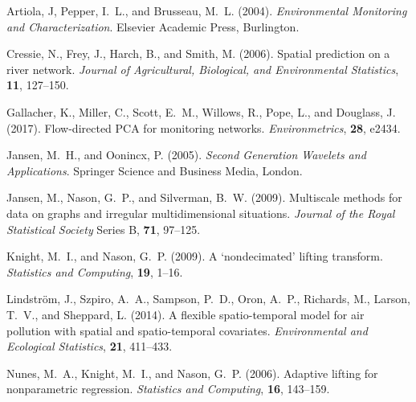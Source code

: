 \documentclass[11pt,titlepage]{article}
\begin{document}
\begin{thebibliography}{}

Artiola, J, Pepper, I.~L., and Brusseau, M.~L. (2004). {\em Environmental Monitoring and Characterization}. Elsevier Academic Press, Burlington. 

Cressie, N., Frey, J., Harch, B., and Smith, M. (2006). Spatial prediction on a river network. {\em Journal of Agricultural, Biological, and Environmental Statistics}, {\bf 11}, 127--150.

Gallacher, K., Miller, C., Scott, E.~M., Willows, R., Pope, L., and Douglass, J. (2017). Flow-directed PCA for monitoring networks. {\em Environmetrics}, {\bf 28}, e2434. 

Jansen, M.~H., and Oonincx, P. (2005). {\em Second Generation Wavelets and Applications}. Springer Science and Business Media, London. 

Jansen, M., Nason, G.~P., and Silverman, B.~W. (2009). Multiscale methods for data on graphs and irregular multidimensional situations. {\em Journal of the Royal Statistical Society} Series B, {\bf 71}, 97--125.

Knight, M.~I., and Nason, G.~P. (2009). A `nondecimated' lifting transform. {\em Statistics and Computing}, {\bf 19}, 1--16.

Lindstr\"{o}m, J., Szpiro, A.~A., Sampson, P.~D., Oron, A.~P., Richards, M., Larson, T.~V., and Sheppard, L. (2014). A flexible spatio-temporal model for air pollution with spatial and spatio-temporal covariates. {\em Environmental and Ecological Statistics}, {\bf 21}, 411--433. 


Nunes, M.~A., Knight, M.~I., and Nason, G.~P. (2006). Adaptive lifting for nonparametric regression. {\em Statistics and Computing}, {\bf 16}, 143--159.


\end{thebibliography}
\end{document}
